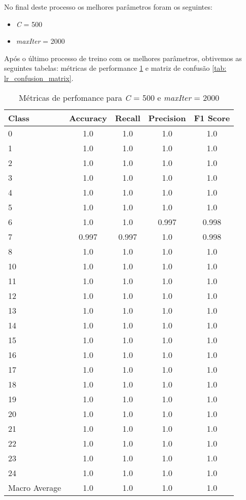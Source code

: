 No final deste processo os melhores parâmetros foram os seguintes:
\begin{itemize}
    \item \textit{C} = 500
    \item \textit{maxIter} = 2000
\end{itemize}

Após o último processo de treino com os melhores parâmetros, obtivemos as seguintes tabelas: métricas de performance \ref{tab: lr_perfomance} e matriz de confusão \ref{tab: lr_confusion_matrix}.


\begin{table}[!htp]
\caption{Métricas de perfomance para \textit{C} = 500 e \textit{maxIter} = 2000}
\begin{center}
\begin{tabular}{l c c c c}
Class & Accuracy & Recall & Precision & F1 Score\\ \hline
0 & 1.0 & 1.0 & 1.0 & 1.0\\
1 & 1.0 & 1.0 & 1.0 & 1.0\\
2 & 1.0 & 1.0 & 1.0 & 1.0\\
3 & 1.0 & 1.0 & 1.0 & 1.0\\
4 & 1.0 & 1.0 & 1.0 & 1.0\\
5 & 1.0 & 1.0 & 1.0 & 1.0\\
6 & 1.0 & 1.0 & 0.997 & 0.998\\
7 & 0.997 & 0.997 & 1.0 & 0.998\\
8 & 1.0 & 1.0 & 1.0 & 1.0\\
10 & 1.0 & 1.0 & 1.0 & 1.0\\
11 & 1.0 & 1.0 & 1.0 & 1.0\\
12 & 1.0 & 1.0 & 1.0 & 1.0\\
13 & 1.0 & 1.0 & 1.0 & 1.0\\
14 & 1.0 & 1.0 & 1.0 & 1.0\\
15 & 1.0 & 1.0 & 1.0 & 1.0\\
16 & 1.0 & 1.0 & 1.0 & 1.0\\
17 & 1.0 & 1.0 & 1.0 & 1.0\\
18 & 1.0 & 1.0 & 1.0 & 1.0\\
19 & 1.0 & 1.0 & 1.0 & 1.0\\
20 & 1.0 & 1.0 & 1.0 & 1.0\\
21 & 1.0 & 1.0 & 1.0 & 1.0\\
22 & 1.0 & 1.0 & 1.0 & 1.0\\
23 & 1.0 & 1.0 & 1.0 & 1.0\\
24 & 1.0 & 1.0 & 1.0 & 1.0\\
\hline
Macro Average & 1.0 & 1.0 & 1.0 & 1.0\\
\end{tabular}

\label{tab: lr_perfomance}
\end{center}
\end{table}


